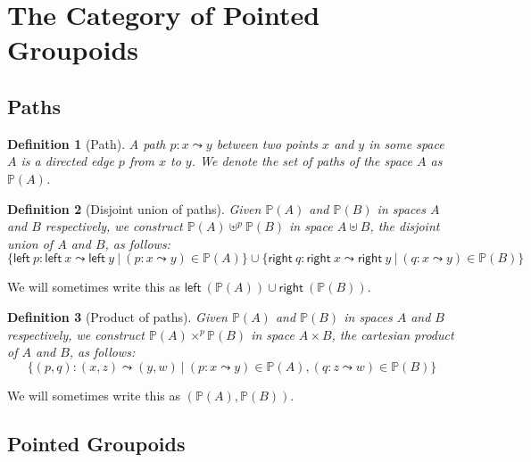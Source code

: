 \documentclass[11pt]{article}
\newtheorem{definition}{Definition}
\newcommand{\union}{\cup}
\renewcommand{\path}{\leadsto}
\newcommand{\paths}[1]{\mathds{P}(#1)}
\newcommand{\leftv}[1]{\textsf{left}~#1}
\newcommand{\rightv}[1]{\textsf{right}~#1}
\begin{document}
\section{The Category of Pointed Groupoids}

\subsection{Paths} 

\begin{definition}[Path]
A \emph{path} $p : x \path y$ between two points $x$ and $y$ in some space
$A$ is a directed edge $p$ from $x$ to $y$. We denote the set of paths of the
space $A$ as $\paths{A}$.
\end{definition}

\begin{definition}[Disjoint union of paths]
Given $\paths{A}$ and $\paths{B}$ in spaces $A$ and $B$ respectively, we
construct $\paths{A} \uplus^p \paths{B}$ in space $A \uplus B$, the disjoint
union of $A$ and $B$, as follows:
\[ 
  \{ \leftv{p} : \leftv{x} \path \leftv{y} ~|~ 
    (p : x \path y) \in \paths{A} \}
  \union
  \{ \rightv{q} : \rightv{x} \path \rightv{y} ~|~ 
    (q : x \path y) \in \paths{B} \}
\]
\end{definition}
We will sometimes write this as $\leftv{(\paths{A})} \union
\rightv{(\paths{B})}$.

\begin{definition}[Product of paths]
Given $\paths{A}$ and $\paths{B}$ in spaces $A$ and $B$
respectively, we construct $\paths{A} \times^p \paths{B}$ in
space $A \times B$, the cartesian product of $A$ and $B$, as follows: 
\[ 
\{ (p,q) : (x,z) \path (y,w) ~|~ (p : x \path y) \in \paths{A}, 
   (q : z \path w) \in \paths{B} \}
\]
\end{definition}
We will sometimes write this as $(\paths{A},\paths{B})$.

\subsection{Pointed Groupoids} 
\end{document}
